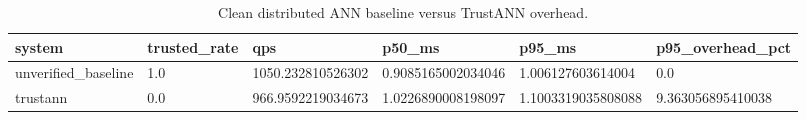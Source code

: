 \begin{table}[t]
\centering
\footnotesize
\caption{Clean distributed ANN baseline versus TrustANN overhead.}
\label{tab:harness-clean-overhead}
\begin{tabular}{llllll}
\toprule
system & trusted_rate & qps & p50_ms & p95_ms & p95_overhead_pct \\
\midrule
unverified_baseline & 1.0 & 1050.232810526302 & 0.9085165002034046 & 1.006127603614004 & 0.0 \\
trustann & 0.0 & 966.9592219034673 & 1.0226890008198097 & 1.1003319035808088 & 9.363056895410038 \\
\bottomrule
\end{tabular}
\end{table}